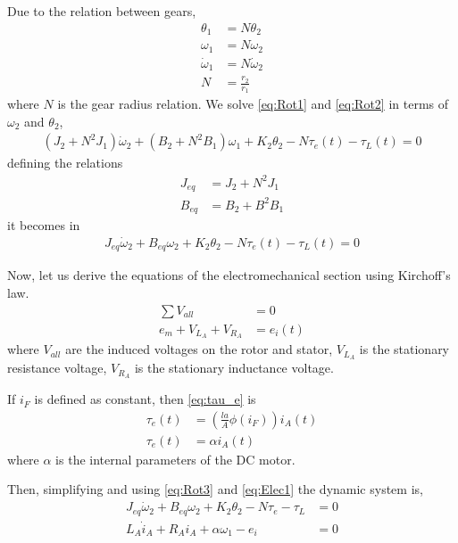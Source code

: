 \documentclass[]{article}
\begin{document}
Due to the relation between gears,
\begin{align*}
	\theta_1       & = N \theta_2       \\
	\omega_1       & = N \omega_2       \\
	\dot{\omega}_1 & = N \dot{\omega}_2 \\
	N              & = \frac{r_2}{r_1}
\end{align*}
where $N$ is the gear radius relation. We solve \eqref{eq:Rot1} and \eqref{eq:Rot2} in terms of $\omega_2$ and $\theta_2$,
\begin{align}
	(J_2+N^2 J_1)\dot{\omega}_2+(B_2+N^2 B_1)\omega_1+K_2 \theta_2-N \tau_e(t)-\tau_L(t) = 0 \nonumber 
\end{align}
defining the relations
\begin{align*}
	J_{eq} & = J_2+N^2 J_1 \\
	B_{eq} & = B_2+B^2 B_1
\end{align*}
it becomes in
\begin{align}	
	J_{eq} \dot{\omega}_2+B_{eq} \omega_2+K_2 \theta_2-N \tau_e(t)-\tau_L(t) = 0 \label{eq:Rot3}
\end{align}

Now, let us derive the equations of the electromechanical section using Kirchoff's law.
\begin{align}
	\sum V_{all}            & = 0 		\nonumber             \\
	e_m+V_{L_{A}}+V_{R_{A}} & = e_i(t) 	\label{eq:Elec1}
\end{align}
where $V_{all}$ are the induced voltages on the rotor and stator, $V_{L_{A}}$ is the stationary resistance voltage, $V_{R_{A}}$ is the stationary inductance voltage.  

If $i_F$ is defined as constant, then \eqref{eq:tau_e} is
\begin{align}
	\tau_e(t) & = \left( \frac{l a}{A} \phi(i_F) \right) i_A(t)	\nonumber \\
	\tau_e(t) & = \alpha i_A(t)
\end{align}
where $\alpha$ is the internal parameters of the DC motor.

Then, simplifying and using \eqref{eq:Rot3} and \eqref{eq:Elec1} the dynamic system is, 
\begin{align}
	J_{eq} \dot{\omega}_2+B_{eq} \omega_2+K_2 \theta_2-N \tau_e - \tau_L & = 0 \\
	L_A \dot{i}_A + R_A i_A + \alpha \omega_1 - e_i                      & = 0
\end{align}
\end{document}
